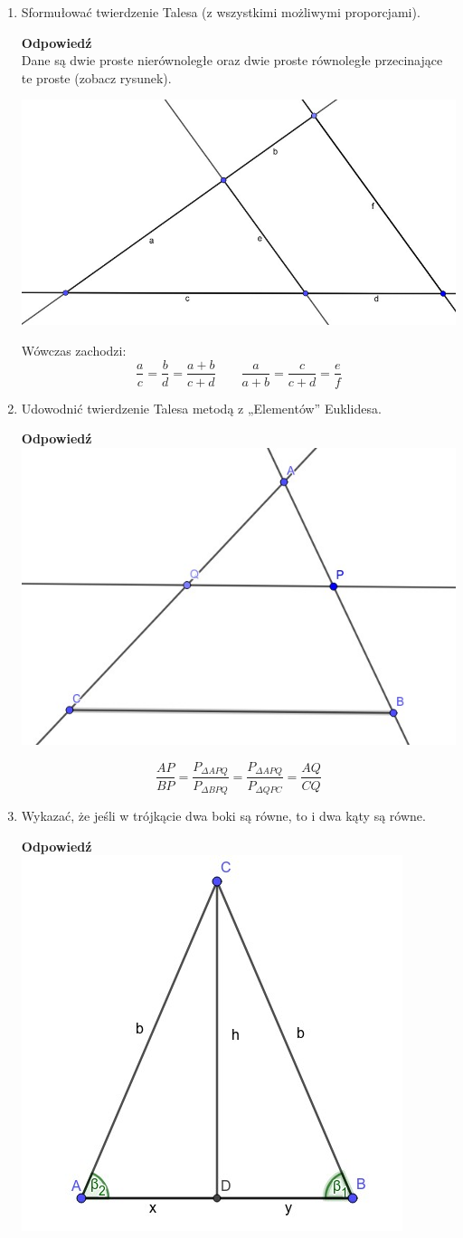 \documentclass[12pt,a4paper]{article}
\newcounter{twierdzenie}
\theoremstyle{break}
\newcommand{\Odp}[1]{
		\begin{mdframed}[style=zadanie]
			\textbf{Odpowiedź}\\
			#1
		\end{mdframed}
	}
\begin{document}
\begin{enumerate}[1.]
{	}
	
	\item Sformułować twierdzenie Talesa (z wszystkimi możliwymi proporcjami).
	\Odp{
		Dane są dwie proste nierównoległe oraz dwie proste równoległe przecinające te proste (zobacz rysunek).
		
		\includegraphics[width=\linewidth]{tales.jpeg}
		
		Wówczas zachodzi:
		$$\frac{a}{c}=\frac{b}{d}=\frac{a+b}{c+d}\qquad\frac{a}{a+b}=\frac{c}{c+d}=\frac{e}{f}$$
	}
	
	\item Udowodnić twierdzenie Talesa metodą z „Elementów” Euklidesa.
	\Odp{
		\includegraphics[width=\linewidth]{tales_proof.jpeg}
		
		$$\frac{AP}{BP}=\frac{P_{\Delta APQ}}{P_{\Delta BPQ}}=\frac{P_{\Delta APQ}}{P_{\Delta QPC}}=\frac{AQ}{CQ}$$
	}
	
	\item Wykazać, że jeśli w trójkącie dwa boki są równe, to i dwa kąty są równe.
	\Odp{
		\includegraphics[width=0.5\linewidth]{trj_proof_1.jpeg}
		
}
\end{enumerate}
\end{document}
